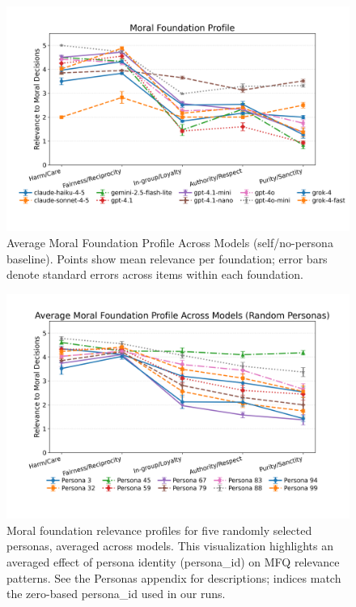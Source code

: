 \documentclass{article}
\begin{document}
\begin{figure}[t]
  \centering
  \includegraphics[width=\linewidth]{../results/moral_foundations_relevance_profiles.png}
  \caption{Average Moral Foundation Profile Across Models (self/no-persona baseline). Points show mean relevance per foundation; error bars denote standard errors across items within each foundation.}
  \label{fig:mfq-profiles}
\end{figure}

\begin{figure}[t]
  \centering
  \includegraphics[width=\linewidth]{../results/persona_moral_foundations_relevance_profiles.png}
  \caption{Moral foundation relevance profiles for five randomly selected personas, averaged across models. This visualization highlights an averaged effect of persona identity (persona\_id) on MFQ relevance patterns. See the Personas appendix for descriptions; indices match the zero-based persona\_id used in our runs.}
  \label{fig:persona-mfq-profiles}
\end{figure}
\end{document}
